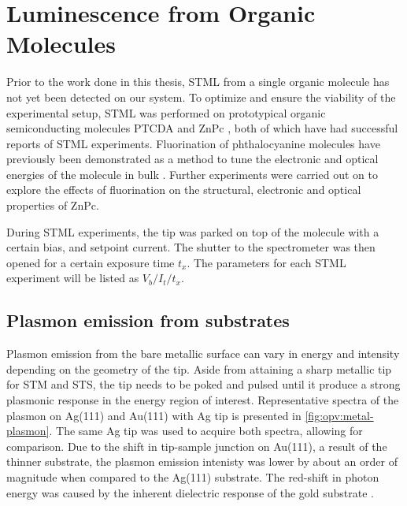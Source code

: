 
\chapter{Luminescence from Organic Molecules}
\label{ch:opv}

Prior to the work done in this thesis, \ac{STML} from a single organic molecule has not yet been detected on our system. To optimize and ensure the viability of the experimental setup, \ac{STML} was performed on prototypical organic semiconducting molecules \ac{PTCDA} \citep{Rzeznicka2011, Kimura2019} and \ac{ZnPc} \citep{Zhang2016, Doppagne2017, Zhang2017, Imada2016, Doppagne2018, Miwa2019}, both of which have had successful reports of \ac{STML} experiments. Fluorination of phthalocyanine molecules have previously been demonstrated as a method to tune the electronic and optical energies of the molecule in bulk \citep{schwarze2016band, warren2019controlling}. Further experiments were carried out on  to explore the effects of fluorination on the structural, electronic and optical properties of ZnPc.

During \ac{STML} experiments, the tip was parked on top of the molecule with a certain bias, and setpoint current. The shutter to the spectrometer was then opened for a certain exposure time $t_x$. The parameters for each \ac{STML} experiment will be listed as $V_b/I_t/t_x$.


\section{Plasmon emission from substrates}

Plasmon emission from the bare metallic surface can vary in energy and intensity depending on the geometry of the tip. Aside from attaining a sharp metallic tip for \ac{STM} and \ac{STS}, the tip needs to be poked and pulsed until it produce a strong plasmonic response in the energy region of interest. Representative spectra of the plasmon on Ag(111) and Au(111) with Ag tip is presented in \autoref{fig:opv:metal-plasmon}. The same Ag tip was used to acquire both spectra, allowing for comparison. Due to the shift in tip-sample junction on Au(111), a result of the thinner substrate, the plasmon emission intenisty was lower by about an order of magnitude when compared to the Ag(111) substrate. The red-shift in photon energy was caused by the inherent dielectric response of the gold substrate \citep{olmon2012optical, yang2015optical}. 

